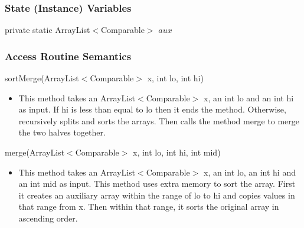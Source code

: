 \documentclass[12pt,fleqn]{article}
\begin{document}
\subsubsection*{State (Instance) Variables}
	private static ArrayList$<$Comparable$>$ $aux$
\subsubsection*{Access Routine Semantics}

\noindent sortMerge(ArrayList$<$Comparable$>$ x, int lo, int hi)
\begin{itemize}
\item This method takes an ArrayList$<$Comparable$>$ x, an int lo and an int hi as input. If hi is less than equal to lo then it ends the method. Otherwise, recursively splits and sorts the arrays. Then calls the method merge to merge the two halves together.
\end{itemize}

\noindent merge(ArrayList$<$Comparable$>$ x, int lo, int hi, int mid)
\begin{itemize}
\item This method takes an ArrayList$<$Comparable$>$ x, an int lo, an int hi and an int mid as input. This method uses extra memory to sort the array. First it creates an auxiliary array within the range of lo to hi and copies values in that range from x. Then within that range, it sorts the original array in ascending order.
\end{itemize}
\end{document}
